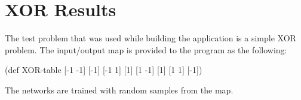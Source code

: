 \section{XOR Results}
The test problem that was used while building the application is a simple XOR problem. The input/output map is provided to the program as the following: 

(def XOR-table {[-1 -1] [-1]
                [-1 1] [1]
                [1 -1] [1]
                [1 1] [-1]})

The networks are trained with random samples from the map.

